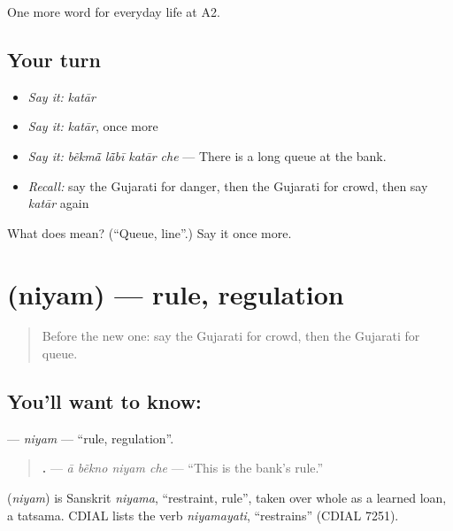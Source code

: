 \begin{grammarlens}[title={What you've built}]
One more word for everyday life at A2.
\end{grammarlens}

\subsection*{Your turn}
\begin{itemize}
\raggedright
  \item \emph{Say it:} \emph{katār}
  \item \emph{Say it:} \emph{katār}, once more
  \item \emph{Say it:} \emph{bẽkmā̃ lā̃bī katār che} — There is a long queue at the bank.
  \item \emph{Recall:} say the Gujarati for danger, then the Gujarati for crowd, then say \emph{katār} again
\end{itemize}

\begin{tcolorbox}[breakable,colback=teal!4,colframe=teal!35!black,title={Before you move on}]
What does  mean? (\textquotedblleft{}Queue, line\textquotedblright{}.) Say it once more.
\end{tcolorbox}
\section[\texorpdfstring{\gu{નિયમ} (niyam)}{નિયમ (niyam)}]{ (niyam) — rule, regulation}

\label{lesson:GU-C199-niyam}



\begin{quote}
Before the new one: say the Gujarati for crowd, then the Gujarati for queue.
\end{quote}

\subsection*{You'll want to know: }
\textbf{} — \emph{niyam} — \textquotedblleft{}rule, regulation\textquotedblright{}.

\begin{quote}
\textbf{   .} — \emph{ā bẽkno niyam che} — \textquotedblleft{}This is the bank's rule.\textquotedblright{}
\end{quote}

\begin{cousinweb}
\textbf{} (\emph{niyam}) is Sanskrit \emph{niyama}, \textquotedblleft{}restraint, rule\textquotedblright{}, taken over whole as a learned loan, a tatsama. CDIAL lists the verb \emph{niyamayati}, \textquotedblleft{}restrains\textquotedblright{} (CDIAL 7251).
\end{cousinweb}


